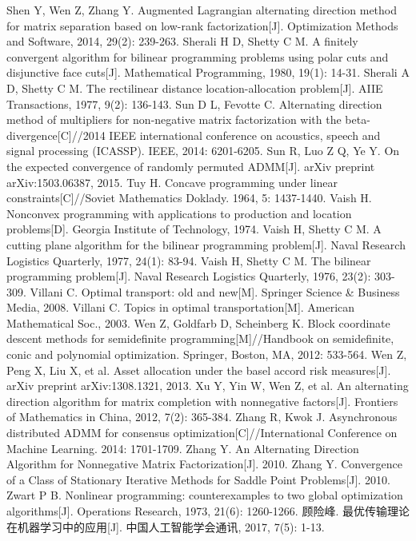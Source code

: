 \documentclass[UTF8,10.5pt,a4paper]{ctexart}
\theoremstyle{definition}
\theoremstyle{definition}
\begin{document}
\begin{thebibliography}{MM}
\begin{small}
		 Shen Y, Wen Z, Zhang Y. Augmented Lagrangian alternating direction method for matrix separation based on low-rank factorization[J]. Optimization Methods and Software, 2014, 29(2): 239-263.
		 Sherali H D, Shetty C M. A finitely convergent algorithm for bilinear programming problems using polar cuts and disjunctive face cuts[J]. Mathematical Programming, 1980, 19(1): 14-31.
		 Sherali A D, Shetty C M. The rectilinear distance location-allocation problem[J]. AIIE Transactions, 1977, 9(2): 136-143.
		 Sun D L, Fevotte C. Alternating direction method of multipliers for non-negative matrix factorization with the beta-divergence[C]//2014 IEEE international conference on acoustics, speech and signal processing (ICASSP). IEEE, 2014: 6201-6205.
		 Sun R, Luo Z Q, Ye Y. On the expected convergence of randomly permuted ADMM[J]. arXiv preprint arXiv:1503.06387, 2015.
		 Tuy H. Concave programming under linear constraints[C]//Soviet Mathematics Doklady. 1964, 5: 1437-1440.
		 Vaish H. Nonconvex programming with applications to production and location problems[D]. Georgia Institute of Technology, 1974.
		 Vaish H, Shetty C M. A cutting plane algorithm for the bilinear programming problem[J]. Naval Research Logistics Quarterly, 1977, 24(1): 83-94.
		 Vaish H, Shetty C M. The bilinear programming problem[J]. Naval Research Logistics Quarterly, 1976, 23(2): 303-309.
		 Villani C. Optimal transport: old and new[M]. Springer Science \& Business Media, 2008.
		 Villani C. Topics in optimal transportation[M]. American Mathematical Soc., 2003.
		 Wen Z, Goldfarb D, Scheinberg K. Block coordinate descent methods for semidefinite programming[M]//Handbook on semidefinite, conic and polynomial optimization. Springer, Boston, MA, 2012: 533-564.
		 Wen Z, Peng X, Liu X, et al. Asset allocation under the basel accord risk measures[J]. arXiv preprint arXiv:1308.1321, 2013.
		 Xu Y, Yin W, Wen Z, et al. An alternating direction algorithm for matrix completion with nonnegative factors[J]. Frontiers of Mathematics in China, 2012, 7(2): 365-384.
		 Zhang R, Kwok J. Asynchronous distributed ADMM for consensus optimization[C]//International Conference on Machine Learning. 2014: 1701-1709.
		 Zhang Y. An Alternating Direction Algorithm for Nonnegative Matrix Factorization[J]. 2010.
		 Zhang Y. Convergence of a Class of Stationary Iterative Methods for Saddle Point Problems[J]. 2010.
		 Zwart P B. Nonlinear programming: counterexamples to two global optimization algorithms[J]. Operations Research, 1973, 21(6): 1260-1266.
		 顾险峰. 最优传输理论在机器学习中的应用[J]. 中国人工智能学会通讯, 2017, 7(5): 1-13.
	\end{small}
\end{thebibliography}
\newpage
\end{document}

